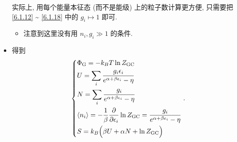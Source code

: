\begin{itemize}
\begin{tcolorbox}[title=calculation:]
		实际上, 用每个能量本征态 (而不是能级) 上的粒子数计算更方便, 只需要把 \eqref{6.1.12} \~{} \eqref{6.1.18} 中的 $g_i \mapsto 1$ 即可.
	\end{tcolorbox}
	
	\begin{itemize}
		\item 注意到这里没有用 $n_i, g_i \gg 1$ 的条件.
	\end{itemize}
	
	\item 得到
	\begin{equation}
		\begin{dcases}
			\Phi_\text{G} = - k_B T \ln Z_\text{GC} \\
			U = \sum_i \frac{g_i \epsilon_i}{e^{\alpha + \beta \epsilon_i} - \eta} \\
			N = \sum_i \frac{g_i}{e^{\alpha + \beta \epsilon_i} - \eta} \\
			\braket{n_i} = - \frac{1}{\beta} \frac{\partial}{\partial \epsilon_i} \ln Z_\text{GC} = \frac{g_i}{e^{\alpha + \beta \epsilon_i} - \eta} \\
			S = k_B \Big( \beta U + \alpha N + \ln Z_\text{GC} \Big)
		\end{dcases}.
	\end{equation}
\end{itemize}


